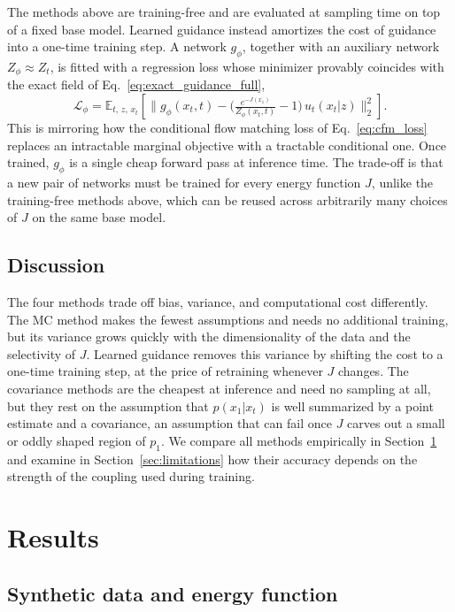 \documentclass{article}
\begin{document}
The methods above are training-free and are evaluated at sampling time on top of a fixed base model.
Learned guidance instead amortizes the cost of guidance into a one-time training step.
A network $g_\phi$, together with an auxiliary network $Z_\phi \approx Z_t$, is fitted with a regression loss whose minimizer provably coincides with the exact field of Eq.~\eqref{eq:exact_guidance_full},
\begin{equation}
    \mathcal{L}_\phi = \mathbb{E}_{t,\, z,\, x_t}\left[\Big\| g_\phi(x_t,t) - \Big(\tfrac{e^{-J(x_1)}}{Z_\phi(x_t,t)} - 1\Big)\, u_t(x_t|z) \Big\|_2^2\right].
    \label{eq:gm_loss}
\end{equation}
This is mirroring how the conditional flow matching loss of Eq.~\eqref{eq:cfm_loss} replaces an intractable marginal objective with a tractable conditional one.
Once trained, $g_\phi$ is a single cheap forward pass at inference time.
The trade-off is that a new pair of networks must be trained for every energy function $J$, unlike the training-free methods above, which can be reused across arbitrarily many choices of $J$ on the same base model.

\subsection{Discussion}

The four methods trade off bias, variance, and computational cost differently.
The MC method makes the fewest assumptions and needs no additional training, but its variance grows quickly with the dimensionality of the data and the selectivity of $J$.
Learned guidance removes this variance by shifting the cost to a one-time training step, at the price of retraining whenever $J$ changes.
The covariance methods are the cheapest at inference and need no sampling at all, but they rest on the assumption that $p(x_1|x_t)$ is well summarized by a point estimate and a covariance, an assumption that can fail once $J$ carves out a small or oddly shaped region of $p_1$.
We compare all methods empirically in Section~\ref{sec:results} and examine in Section~\ref{sec:limitations} how their accuracy depends on the strength of the coupling used during training.

\section{Results}
\label{sec:results}

\subsection{Synthetic data and energy function}
\end{document}
